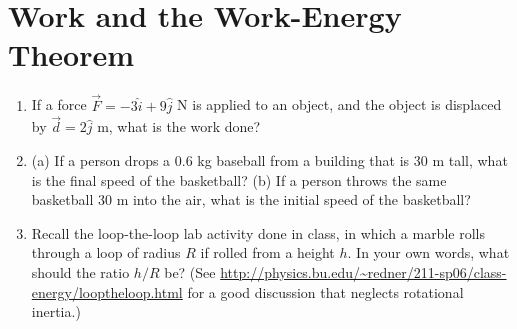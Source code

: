 \documentclass[10pt]{article}
\begin{document}
\section{Work and the Work-Energy Theorem}
\begin{enumerate}
\item If a force $\vec{F} = -3 \hat{i} + 9\hat{j}$ N is applied to an object, and the object is displaced by $\vec{d} = 2\hat{j}$ m, what is the work done? \\ \vspace{1cm}
\item (a) If a person drops a 0.6 kg baseball from a building that is 30 m tall, what is the final speed of the basketball? (b) If a person throws the same basketball 30 m into the air, what is the initial speed of the basketball? \\ \vspace{1cm}
\item Recall the loop-the-loop lab activity done in class, in which a marble rolls through a loop of radius $R$ if rolled from a height $h$.  In your own words, what should the ratio $h/R$ be?  (See \url{http://physics.bu.edu/~redner/211-sp06/class-energy/looptheloop.html} for a good discussion that neglects rotational inertia.)
\end{enumerate}
\end{document}
